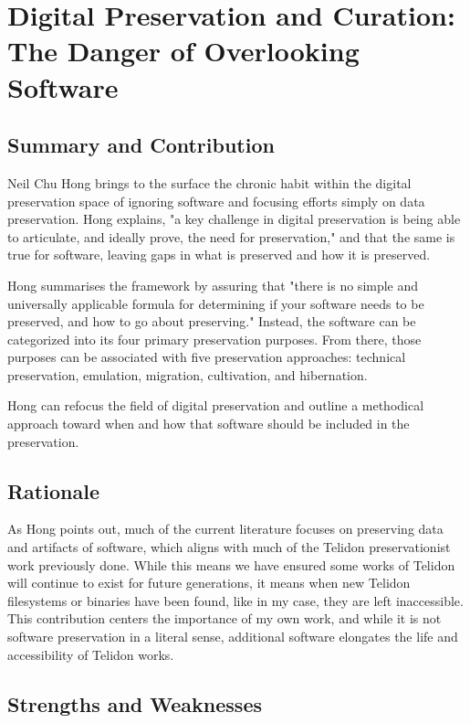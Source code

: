 \documentclass[sigconf]{acmart}
\begin{document}
\section{Digital Preservation and Curation: The Danger of Overlooking Software}


\subsection{Summary and Contribution}

Neil Chu Hong brings to the surface the chronic habit within the digital preservation space of ignoring software and focusing efforts simply on data preservation. Hong explains, "a key challenge in digital preservation is being able to articulate, and ideally prove, the need for preservation," and that the same is true for software, leaving gaps in what is preserved and how it is preserved.

Hong summarises the framework by assuring that "there is no simple and universally applicable formula for determining if your software needs to be preserved, and how to go about preserving." Instead, the software can be categorized into its four primary preservation purposes. From there, those purposes can be associated with five preservation approaches: technical preservation, emulation, migration, cultivation, and hibernation.

Hong can refocus the field of digital preservation and outline a methodical approach toward when and how that software should be included in the preservation.

\subsection{Rationale}

As Hong points out, much of the current literature focuses on preserving data and artifacts of software, which aligns with much of the Telidon preservationist work previously done. While this means we have ensured some works of Telidon will continue to exist for future generations, it means when new Telidon filesystems or binaries have been found, like in my case, they are left inaccessible. This contribution centers the importance of my own work, and while it is not software preservation in a literal sense, additional software elongates the life and accessibility of Telidon works. 

\subsection{Strengths and Weaknesses}
\end{document}
